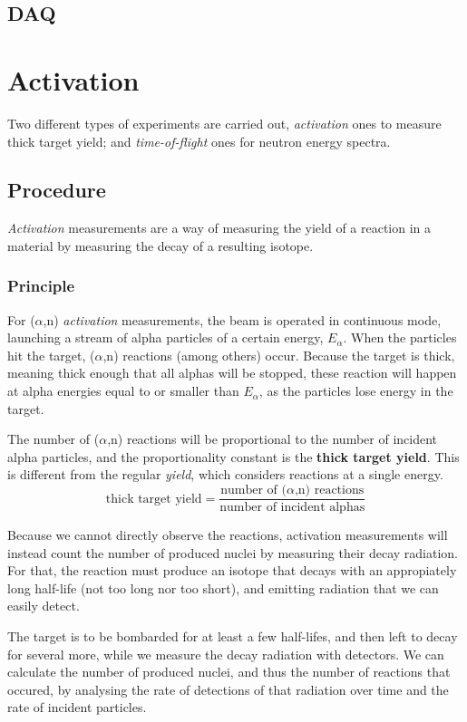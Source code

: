 \documentclass[a4paper,12pt]{report}
\newcommand{\an}{($\alpha$,n) }
\begin{document}
\section{DAQ}


\chapter{Activation}
Two different types of experiments are carried out, \textit{activation} ones to measure thick target yield; and \textit{time-of-flight} ones for neutron energy spectra.

\section{Procedure}
\textit{Activation} measurements are a way of measuring the yield of a reaction in a material by measuring the decay of a resulting isotope.

\subsection{Principle}
For \an \textit{activation} measurements, the beam is operated in continuous mode, launching a stream of alpha particles of a certain energy, $E_\alpha$.
When the particles hit the target, \an reactions (among others) occur.
Because the target is thick, meaning thick enough that all alphas will be stopped, these reaction will happen at alpha energies equal to or smaller than $E_\alpha$, as the particles lose energy in the target.

The number of \an reactions will be proportional to the number of incident alpha particles, and the proportionality constant is the \textbf{thick target yield}.
This is different from the regular \textit{yield}, which considers reactions at a single energy.
\begin{equation}
	\text{thick target yield} = \frac{\text{number of \an reactions}}{\text{number of incident alphas}}
	\label{tty_def}
\end{equation}

Because we cannot directly observe the reactions, activation measurements will instead count the number of produced nuclei by measuring their decay radiation.
For that, the reaction must produce an isotope that decays with an appropiately long half-life (not too long nor too short), and emitting radiation that we can easily detect.

The target is to be bombarded for at least a few half-lifes, and then left to decay for several more, while we measure the decay radiation with detectors.
We can calculate the number of produced nuclei, and thus the number of reactions that occured, by analysing the rate of detections of that radiation over time and the rate of incident particles.
\end{document}
